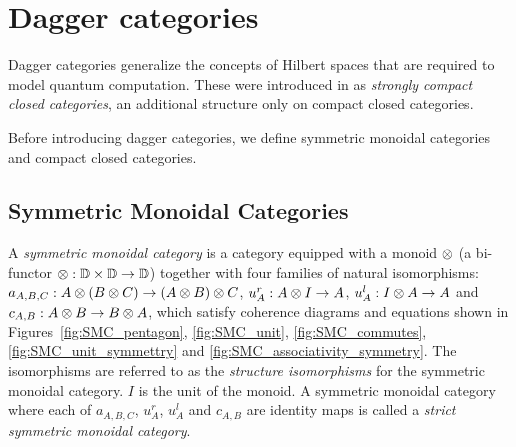 \section{Dagger categories}\label{sec:daggercategories}
Dagger categories generalize the concepts of Hilbert spaces that are required to model quantum
computation. These were introduced in \cite{abramsky04:catsemquantprot} as \emph{strongly compact
closed categories}, an additional structure only on compact closed categories.

Before introducing dagger categories, we define symmetric monoidal categories and compact closed
categories.


\subsection{Symmetric Monoidal Categories} %
\label{sub:categories_with_additional_structure}

\begin{definition}\label{symmetricmonoidalcat}
  A \emph{symmetric monoidal category}\cite{barr:ctcs,maclan97:categorieswrkmath} \cD{} is a
  category equipped with a monoid $\otimes$ (a bi-functor $\otimes:\mathbb{D} \times \mathbb{D} \to \mathbb{D}$) together with
  four families of natural isomorphisms:  $a_{A,B,C}:A\otimes(B\otimes C) \to (A\otimes B)\otimes C$, $u^r_{A}:A\otimes I\to A$,
  $u^l_{A}:I\otimes A \to A$ and $c_{A,B}:A\otimes B \to B\otimes A$, which satisfy coherence diagrams and
  equations shown in Figures~\ref{fig:SMC_pentagon}, \ref{fig:SMC_unit}, \ref{fig:SMC_commutes},
  \ref{fig:SMC_unit_symmettry} and \ref{fig:SMC_associativity_symmetry}. The isomorphisms are
  referred to as the \emph{structure isomorphisms}  for the symmetric monoidal category. $I$ is the
  unit of the monoid. A symmetric monoidal category where each of $a_{A,B,C}$, $u^r_{A}$, $u^l_{A}$
  and $c_{A,B}$ are identity maps is called a \emph{strict symmetric monoidal category}.
\end{definition}


